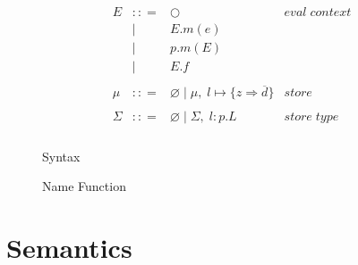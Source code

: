 \documentclass{llncs}
\numberwithin{subcase}{casethm}
\numberwithin{casethm}{theorem}
\numberwithin{casethm}{lemma}
\begin{document}
\begin{figure}[h]
\[\begin{array}{lll}
\begin{array}{lllr}
E & :: = & \bigcirc & eval \; context\\
       & | & E.m(e)\\
       & | & p.m(E)\\
       & | & E.f\\
&&\\
\mu & :: = & \varnothing \; | \; \mu,\; l \mapsto \{z \Rightarrow \overline{d}\} & store \\
&&\\
\Sigma & :: = & \varnothing \; | \; \Sigma,\; l : p.L & store \; type \\
\end{array}
\end{array}
\]
\caption{Syntax}
\label{f:syntax}
\end{figure}



\begin{figure}[h]
\caption{Name Function}
\label{f:name_func}
\end{figure}

\newpage

\section{Semantics}
\end{document}
